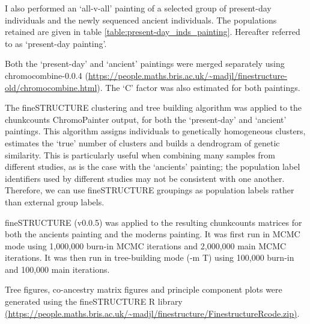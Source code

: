 I also performed an `all-v-all' painting of a selected group of present-day individuals and the newly sequenced ancient individuals. The populations retained are given in table \ref{table:present-day_inds_painting}. Hereafter referred to as `present-day painting'.

Both the `present-day' and `ancient' paintings were merged separately using chromocombine-0.0.4 (\url{https://people.maths.bris.ac.uk/~madjl/finestructure-old/chromocombine.html}). The `C' factor was also estimated for both paintings. 

The fineSTRUCTURE \cite{Lawson2012} clustering and tree building algorithm was applied to the chunkcounts ChromoPainter output, for both the `present-day' and `ancient' paintings. This algorithm assigns individuals to genetically homogeneous clusters, estimates the `true' number of clusters and builds a dendrogram of genetic similarity. This is particularly useful when combining many samples from different studies, as is the case with the `ancients' painting; the population label identifiers used by different studies may not be consistent with one another. Therefore, we can use fineSTRUCTURE groupings as population labels rather than external group labels. 

fineSTRUCTURE (v0.0.5) was applied to the resulting chunkcounts matrices for both the ancients painting and the moderns painting. It was first run in MCMC mode using 1,000,000 burn-in MCMC iterations and 2,000,000 main MCMC iterations. It was then run in tree-building mode (-m T) using 100,000 burn-in and 100,000 main iterations. 

Tree figures, co-ancestry matrix figures and principle component plots were generated using the fineSTRUCTURE R library \url{(https://people.maths.bris.ac.uk/~madjl/finestructure/FinestructureRcode.zip)}.

